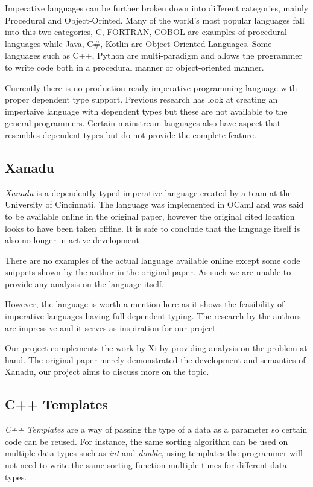 \documentclass[a4paper,12pt]{report}
\begin{document}
\par

Imperative languages can be further broken down into different categories, 
mainly Procedural and Object-Orinted. Many of the world's most popular languages 
fall into this two categories, C, FORTRAN, COBOL are examples of procedural 
languages while Java, C#, Kotlin are Object-Oriented Languages. Some languages such 
as C++, Python are multi-paradigm and allows the programmer to write code both 
in a procedural manner or object-oriented manner. 

\par

Currently there is no production ready imperative programming language with 
proper dependent type support. Previous research has look at creating an 
impertaive language with dependent types but these are not available to the 
general programmers. Certain mainstream languages also have aspect that 
resembles dependent types but do not provide the complete feature.

\subsection{Xanadu}
\textit{Xanadu} \cite{xanadu} is a dependently typed imperative language created by a team at 
the University of Cincinnati. The language was implemented in OCaml and was 
said to be available online in the original paper, however the original cited 
location looks to have been taken offline. It is safe to conclude that 
the language itself is also no longer in active development 

\par
There are no examples of the actual language available online except some code 
snippets shown by the author in the original paper. As such we are unable to 
provide any analysis on the language itself.

\par
However, the language is worth a mention here as it shows the feasibility of 
imperative languages having full dependent typing. The research by the authors 
are impressive and it serves as inspiration for our project. 

\par
Our project complements the work by Xi by providing analysis on the problem at 
hand. The original paper merely demonstrated the development and semantics of 
Xanadu, our project aims to discuss more on the topic. 

\subsection{C++ Templates}
\textit{C++ Templates} \cite{cppTemplate} are a way of passing the type of a 
data as a parameter so certain code can be reused. For instance, the same 
sorting algorithm can be used on multiple data types such as \textit{int} and 
\textit{double}, using templates the programmer will not need to write the same 
sorting function multiple times for different data types. 
\end{document}
